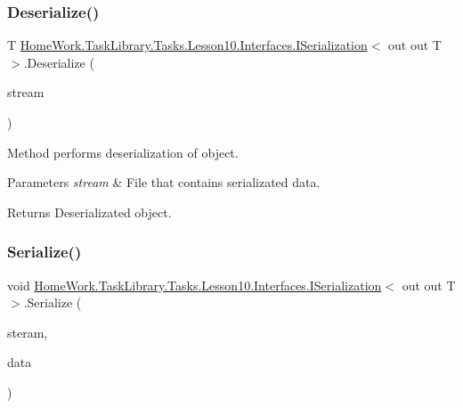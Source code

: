 \subsubsection{\texorpdfstring{Deserialize()}{Deserialize()}}
{\footnotesize\ttfamily T \mbox{\hyperlink{interface_home_work_1_1_task_library_1_1_tasks_1_1_lesson10_1_1_interfaces_1_1_i_serialization}{Home\+Work.\+Task\+Library.\+Tasks.\+Lesson10.\+Interfaces.\+I\+Serialization}}$<$ out out T $>$.Deserialize (\begin{DoxyParamCaption}\item[{Stream}]{stream }\end{DoxyParamCaption})}



Method performs deserialization of object. 


\begin{DoxyParams}{Parameters}
{\em stream} & File that contains serializated data.\\
\hline
\end{DoxyParams}
\begin{DoxyReturn}{Returns}
Deserializated object.
\end{DoxyReturn}
\mbox{\label{interface_home_work_1_1_task_library_1_1_tasks_1_1_lesson10_1_1_interfaces_1_1_i_serialization_aff57c2bdff269d6218fca90b2a341699}} 
\subsubsection{\texorpdfstring{Serialize()}{Serialize()}}
{\footnotesize\ttfamily void \mbox{\hyperlink{interface_home_work_1_1_task_library_1_1_tasks_1_1_lesson10_1_1_interfaces_1_1_i_serialization}{Home\+Work.\+Task\+Library.\+Tasks.\+Lesson10.\+Interfaces.\+I\+Serialization}}$<$ out out T $>$.Serialize (\begin{DoxyParamCaption}\item[{Stream}]{steram,  }\item[{object}]{data }\end{DoxyParamCaption})}



